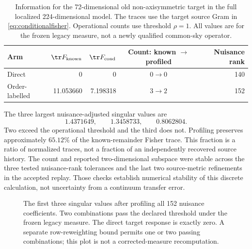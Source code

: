 \begin{table}[htbp]
\centering\small
\caption{Information for the 72-dimensional old non-axisymmetric target in the full localized 224-dimensional model. The traces use the target source Gram in \eqref{eq:conditionalfisher}. Operational counts use threshold $\rho=1$. All values are for the frozen legacy measure, not a newly qualified common-sky operator.}
\label{tab:r2}
\begin{tabular}{l r r c r}
\toprule
Arm&$\tr F_{\rm known}$&$\tr F_{\rm cond}$&Count: known $\to$ profiled&Nuisance rank\\
\midrule
Direct&0&0&$0\to0$&140\\
Order-labelled&11.053660&7.198318&$3\to2$&152\\
\bottomrule
\end{tabular}
\end{table}

The three largest nuisance-adjusted singular values are
\begin{equation}
1.4371649,\qquad 1.3458733,\qquad 0.8062804.
\label{eq:r2singular}
\end{equation}
Two exceed the operational threshold and the third does not. Profiling preserves approximately $65.12\%$ of the known-remainder Fisher trace. This fraction is a ratio of normalized traces, not a fraction of an independently recovered source history. The count and reported two-dimensional subspace were stable across the three tested nuisance-rank tolerances and the last two source-metric refinements in the accepted replay. Those checks establish numerical stability of this discrete calculation, not uncertainty from a continuum transfer error.

\begin{figure}[htbp]
\centering
{}
\caption{The first three singular values after profiling all 152 nuisance coefficients. Two combinations pass the declared threshold under the frozen legacy measure. The direct target response is exactly zero. A separate row-reweighting bound permits one or two passing combinations; this plot is not a corrected-measure recomputation.}
\label{fig:r2}
\end{figure}

